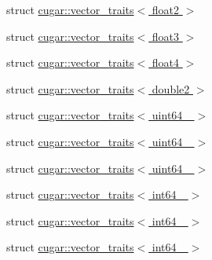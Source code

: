 \begin{DoxyCompactItemize}
\item 
struct \hyperlink{structcugar_1_1vector__traits_3_01float2_01_4}{cugar\+::vector\+\_\+traits$<$ float2 $>$}
\item 
struct \hyperlink{structcugar_1_1vector__traits_3_01float3_01_4}{cugar\+::vector\+\_\+traits$<$ float3 $>$}
\item 
struct \hyperlink{structcugar_1_1vector__traits_3_01float4_01_4}{cugar\+::vector\+\_\+traits$<$ float4 $>$}
\item 
struct \hyperlink{structcugar_1_1vector__traits_3_01double2_01_4}{cugar\+::vector\+\_\+traits$<$ double2 $>$}
\item 
struct \hyperlink{structcugar_1_1vector__traits_3_01uint64__2_01_4}{cugar\+::vector\+\_\+traits$<$ uint64\+\_ $>$}
\item 
struct \hyperlink{structcugar_1_1vector__traits_3_01uint64__3_01_4}{cugar\+::vector\+\_\+traits$<$ uint64\+\_ $>$}
\item 
struct \hyperlink{structcugar_1_1vector__traits_3_01uint64__4_01_4}{cugar\+::vector\+\_\+traits$<$ uint64\+\_ $>$}
\item 
struct \hyperlink{structcugar_1_1vector__traits_3_01int64__2_01_4}{cugar\+::vector\+\_\+traits$<$ int64\+\_ $>$}
\item 
struct \hyperlink{structcugar_1_1vector__traits_3_01int64__3_01_4}{cugar\+::vector\+\_\+traits$<$ int64\+\_ $>$}
\item 
struct \hyperlink{structcugar_1_1vector__traits_3_01int64__4_01_4}{cugar\+::vector\+\_\+traits$<$ int64\+\_ $>$}
\end{DoxyCompactItemize}
